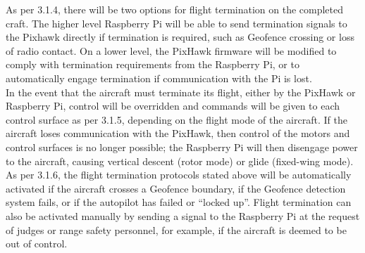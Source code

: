As per 3.1.4, there will be two options for flight termination on the completed craft. The higher level Raspberry Pi will be able to send termination signals to the Pixhawk directly if termination is required, such as Geofence crossing or loss of radio contact.  On a lower level, the PixHawk firmware will be modified to comply with termination requirements from the Raspberry Pi, or to automatically engage termination if communication with the Pi is lost.\\

In the event that the aircraft must terminate its flight, either by the PixHawk or Raspberry Pi, control will be overridden and commands will be given to each control surface as per 3.1.5, depending on the flight mode of the aircraft. If the aircraft loses communication with the PixHawk, then control of the motors and control surfaces is no longer possible; the Raspberry Pi will then disengage power to the aircraft, causing vertical descent (rotor mode) or glide (fixed-wing mode). \\

As per 3.1.6, the flight termination protocols stated above will be automatically activated if the aircraft crosses a Geofence boundary, if the Geofence detection system fails, or if the autopilot has failed or ``locked up''. Flight termination can also be activated manually by sending a signal to the Raspberry Pi at the request of judges or range safety personnel, for example, if the aircraft is deemed to be out of control.
